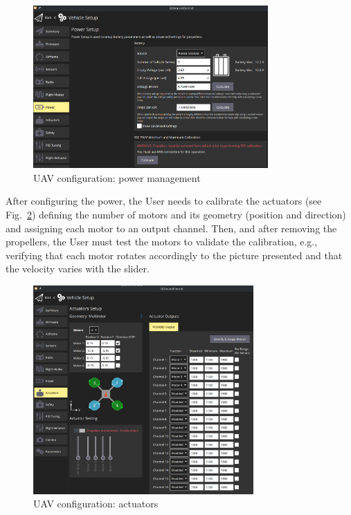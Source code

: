 \begin{figure}[!hbt]
  \centering
  \includegraphics[width=0.8\textwidth]{./img/png/qgc-power} 
  \caption{UAV configuration: power management}
  \label{fig:uav-cfg-power}
\end{figure}

After configuring the power, the User needs to calibrate the actuators (see
Fig.~\ref{fig:uav-cfg-actuators}) defining the number of motors and its
geometry (position and direction) and assigning each motor to an output
channel. Then, and after removing the propellers, the User must test the motors
to validate the calibration, e.g., verifying that each motor rotates accordingly
to the picture presented and that the velocity varies with the slider.

\begin{figure}[!hbt]
  \centering
  \includegraphics[width=0.75\textwidth]{./img/png/qgc-actuators} 
  \caption{UAV configuration: actuators}
  \label{fig:uav-cfg-actuators}
\end{figure}


